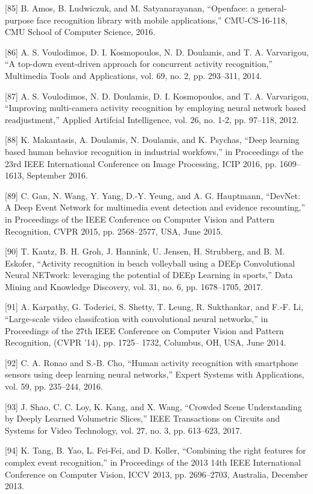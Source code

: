 \documentclass[a4paper]{article}
\begin{document}
	[85] B. Amos, B. Ludwiczuk, and M. Satyanarayanan, “Openface: a
general-purpose face recognition library with mobile applications,” CMU-CS-16-118, CMU School of Computer Science,
2016.


[86] A. S. Voulodimos, D. I. Kosmopoulos, N. D. Doulamis, and T. A.
Varvarigou, “A top-down event-driven approach for concurrent
activity recognition,” Multimedia Tools and Applications, vol. 69,
no. 2, pp. 293–311, 2014.


[87] A. S. Voulodimos, N. D. Doulamis, D. I. Kosmopoulos, and T. A.
Varvarigou, “Improving multi-camera activity recognition by
employing neural network based readjustment,” Applied Artifcial Intelligence, vol. 26, no. 1-2, pp. 97–118, 2012.


[88] K. Makantasis, A. Doulamis, N. Doulamis, and K. Psychas,
“Deep learning based human behavior recognition in industrial workfows,” in Proceedings of the 23rd IEEE International
Conference on Image Processing, ICIP 2016, pp. 1609–1613,
September 2016.


[89] C. Gan, N. Wang, Y. Yang, D.-Y. Yeung, and A. G. Hauptmann,
“DevNet: A Deep Event Network for multimedia event detection and evidence recounting,” in Proceedings of the IEEE
Conference on Computer Vision and Pattern Recognition, CVPR
2015, pp. 2568–2577, USA, June 2015.


[90] T. Kautz, B. H. Groh, J. Hannink, U. Jensen, H. Strubberg, and
B. M. Eskofer, “Activity recognition in beach volleyball using a
DEEp Convolutional Neural NETwork: leveraging the potential
of DEEp Learning in sports,” Data Mining and Knowledge
Discovery, vol. 31, no. 6, pp. 1678–1705, 2017.


[91] A. Karpathy, G. Toderici, S. Shetty, T. Leung, R. Sukthankar,
and F.-F. Li, “Large-scale video classifcation with convolutional
neural networks,” in Proceedings of the 27th IEEE Conference on
Computer Vision and Pattern Recognition, (CVPR ’14), pp. 1725–
1732, Columbus, OH, USA, June 2014.


[92] C. A. Ronao and S.-B. Cho, “Human activity recognition with
smartphone sensors using deep learning neural networks,”
Expert Systems with Applications, vol. 59, pp. 235–244, 2016.


[93] J. Shao, C. C. Loy, K. Kang, and X. Wang, “Crowded Scene
Understanding by Deeply Learned Volumetric Slices,” IEEE
Transactions on Circuits and Systems for Video Technology, vol.
27, no. 3, pp. 613–623, 2017.


[94] K. Tang, B. Yao, L. Fei-Fei, and D. Koller, “Combining the right
features for complex event recognition,” in Proceedings of the
2013 14th IEEE International Conference on Computer Vision,
ICCV 2013, pp. 2696–2703, Australia, December 2013.
\end{document}
